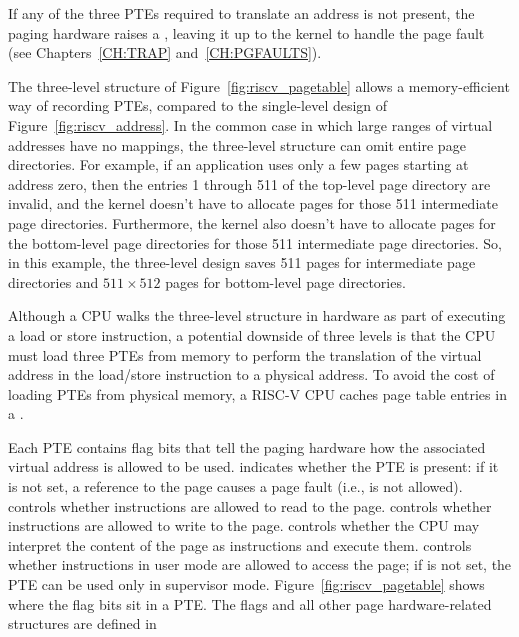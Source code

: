 If any of the three PTEs required to translate an address
is not present, the paging hardware raises a , leaving it up
to the kernel to handle the page fault (see Chapters~\ref{CH:TRAP} and~\ref{CH:PGFAULTS}).

The three-level structure of Figure~\ref{fig:riscv_pagetable} allows a
memory-efficient way of recording PTEs, compared to the single-level
design of Figure~\ref{fig:riscv_address}.  In the common case in which
large ranges of virtual addresses have no mappings, the three-level
structure can omit entire page directories.  For example, if an
application uses only a few pages starting at address zero, then the
entries 1 through 511 of the top-level page directory are invalid, and
the kernel doesn't have to allocate pages for those 511 intermediate
page directories.  Furthermore, the kernel also doesn't have to
allocate pages for the bottom-level page directories for those 511
intermediate page directories. So, in this example, the three-level
design saves 511 pages for intermediate page directories and
$511\times512$ pages for bottom-level page directories.

Although a CPU walks the three-level structure in hardware as part of
executing a load or store instruction, a potential downside of three
levels is that the CPU must load three PTEs from memory to perform the
translation of the virtual address in the load/store instruction to a
physical address.  To avoid the cost of loading PTEs from physical
memory, a RISC-V CPU caches page table entries in a
.

Each PTE contains flag bits that tell the paging hardware
how the associated virtual address is allowed to be used.
indicates whether the PTE is present: if it is
not set, a reference to the page causes a page fault (i.e., is not allowed).
controls whether instructions are allowed to 
read to the page.
controls whether instructions are allowed to 
write to the page.
controls whether the CPU may interpret the content
of the page as instructions and execute them.
controls whether instructions in user mode are allowed
to access the page;
if  is not set, the PTE can be used only in supervisor mode.
Figure~\ref{fig:riscv_pagetable}
shows where the flag bits sit in a PTE.
The flags and all other page hardware-related structures are defined in

